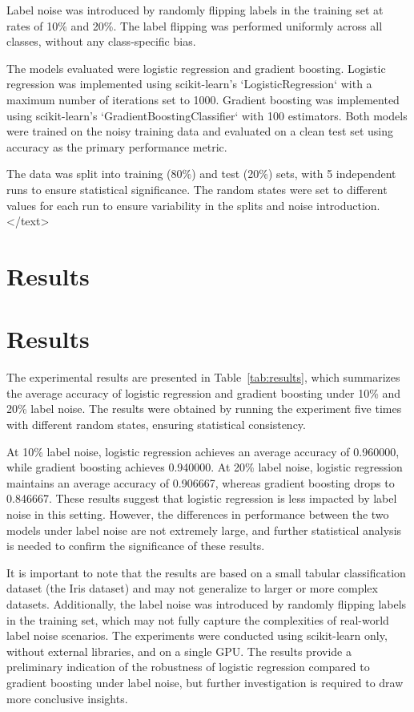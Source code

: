 \documentclass{article}
\begin{document}
Label noise was introduced by randomly flipping labels in the training set at rates of 10\% and 20\%. The label flipping was performed uniformly across all classes, without any class-specific bias. 

The models evaluated were logistic regression and gradient boosting. Logistic regression was implemented using scikit-learn's `LogisticRegression` with a maximum number of iterations set to 1000. Gradient boosting was implemented using scikit-learn's `GradientBoostingClassifier` with 100 estimators. Both models were trained on the noisy training data and evaluated on a clean test set using accuracy as the primary performance metric. 

The data was split into training (80\%) and test (20\%) sets, with 5 independent runs to ensure statistical significance. The random states were set to different values for each run to ensure variability in the splits and noise introduction. 
</text>
\section{Results}
\section{Results}

The experimental results are presented in Table~\ref{tab:results}, which summarizes the average accuracy of logistic regression and gradient boosting under 10\% and 20\% label noise. The results were obtained by running the experiment five times with different random states, ensuring statistical consistency. 

At 10\% label noise, logistic regression achieves an average accuracy of 0.960000, while gradient boosting achieves 0.940000. At 20\% label noise, logistic regression maintains an average accuracy of 0.906667, whereas gradient boosting drops to 0.846667. These results suggest that logistic regression is less impacted by label noise in this setting. However, the differences in performance between the two models under label noise are not extremely large, and further statistical analysis is needed to confirm the significance of these results.

It is important to note that the results are based on a small tabular classification dataset (the Iris dataset) and may not generalize to larger or more complex datasets. Additionally, the label noise was introduced by randomly flipping labels in the training set, which may not fully capture the complexities of real-world label noise scenarios. The experiments were conducted using scikit-learn only, without external libraries, and on a single GPU. The results provide a preliminary indication of the robustness of logistic regression compared to gradient boosting under label noise, but further investigation is required to draw more conclusive insights.
\end{document}
